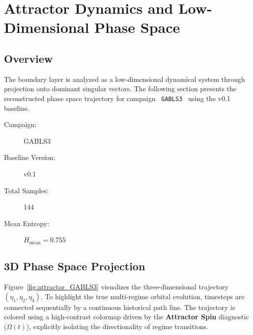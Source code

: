 \documentclass[11pt,a4paper]{article}
\begin{document}
\newpage



\section{Attractor Dynamics and Low-Dimensional Phase Space}

\subsection{Overview}

The boundary layer is analyzed as a low-dimensional dynamical system through projection onto dominant singular vectors. The following section presents the reconstructed phase space trajectory for campaign \texttt{ GABLS3 } using the v0.1 baseline.

\begin{description}
    \item[Campaign:] GABLS3
    \item[Baseline Version:] v0.1
    \item[Total Samples:] 144
    \item[Mean Entropy:] $H_{\text{mean}} = 0.755$
\end{description}

\subsection{3D Phase Space Projection}

Figure~\ref{fig:attractor_GABLS3} visualizes the three-dimensional trajectory $(\eta_1, \eta_2, \eta_3)$. To highlight the true multi-regime orbital evolution, timesteps are connected sequentially by a continuous historical path line. The trajectory is colored using a high-contrast colormap driven by the \textbf{Attractor Spin} diagnostic ($\Omega(t)$), explicitly isolating the directionality of regime transitions.
\end{document}
